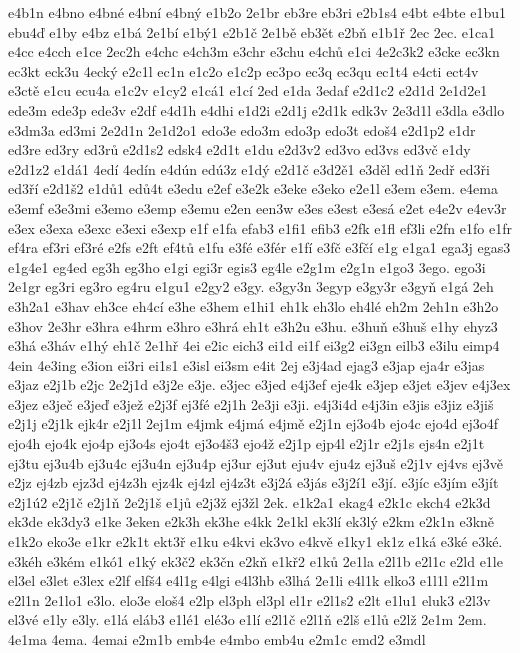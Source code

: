 {e4b1n
e4bno
e4bné
e4bní
e4bný
e1b2o
2e1br
eb3re
eb3ri
e2b1s4
e4bt
e4bte
e1bu1
ebu4ď
e1by
e4bz
e1bá
2e1bí
e1bý1
e2b1č
2e1bě
eb3ět
e2bň
e1b1ř
2ec
2ec.
e1ca1
e4cc
e4cch
e1ce
2ec2h
e4chc
e4ch3m
e3chr
e3chu
e4chů
e1ci
4e2c3k2
e3cke
ec3kn
ec3kt
eck3u
4ecký
e2c1l
ec1n
e1c2o
e1c2p
ec3po
ec3q
ec3qu
ec1t4
e4cti
ect4v
e3ctě
e1cu
ecu4a
e1c2v
e1cy2
e1cá1
e1cí
2ed
e1da
3edaf
e2d1c2
e2d1d
2e1d2e1
ede3m
ede3p
ede3v
e2df
e4d1h
e4dhi
e1d2i
e2d1j
e2d1k
edk3v
2e3d1l
e3dla
e3dlo
e3dm3a
ed3mi
2e2d1n
2e1d2o1
edo3e
edo3m
edo3p
edo3t
edoš4
e2d1p2
e1dr
ed3re
ed3ry
ed3rů
e2d1s2
edsk4
e2d1t
e1du
e2d3v2
ed3vo
ed3vs
ed3vč
e1dy
e2d1z2
e1dá1
4edí
4edín
e4dún
edú3z
e1dý
e2d1č
e3d2ě1
e3děl
ed1ň
2edř
ed3ři
ed3ří
e2d1š2
e1dů1
edů4t
e3edu
e2ef
e3e2k
e3eke
e3eko
e2e1l
e3em
e3em.
e4ema
e3emf
e3e3mi
e3emo
e3emp
e3emu
e2en
een3w
e3es
e3est
e3esá
e2et
e4e2v
e4ev3r
e3ex
e3exa
e3exc
e3exi
e3exp
e1f
e1fa
efab3
e1fi1
efib3
e2fk
e1fl
ef3li
e2fn
e1fo
e1fr
ef4ra
ef3ri
ef3ré
e2fs
e2ft
ef4tů
e1fu
e3fé
e3fér
e1fí
e3fč
e3fčí
e1g
e1ga1
ega3j
egas3
e1g4e1
eg4ed
eg3h
eg3ho
e1gi
egi3r
egis3
eg4le
e2g1m
e2g1n
e1go3
3ego.
ego3i
2e1gr
eg3ri
eg3ro
eg4ru
e1gu1
e2gy2
e3gy.
e3gy3n
3egyp
e3gy3r
e3gyň
e1gá
2eh
e3h2a1
e3hav
eh3ce
eh4cí
e3he
e3hem
e1hi1
eh1k
eh3lo
eh4lé
eh2m
2eh1n
e3h2o
e3hov
2e3hr
e3hra
e4hrm
e3hro
e3hrá
eh1t
e3h2u
e3hu.
e3huň
e3huš
e1hy
ehyz3
e3há
e3háv
e1hý
eh1č
2e1hř
4ei
e2ic
eich3
ei1d
ei1f
ei3g2
ei3gn
eilb3
e3ilu
eimp4
4ein
4e3ing
e3ion
ei3ri
ei1s1
e3isl
ei3sm
e4it
2ej
e3j4ad
ejag3
e3jap
eja4r
e3jas
e3jaz
e2j1b
e2jc
2e2j1d
e3j2e
e3je.
e3jec
e3jed
e4j3ef
eje4k
e3jep
e3jet
e3jev
e4j3ex
e3jez
e3ječ
e3jeď
e3jež
e2j3f
ej3fé
e2j1h
2e3ji
e3ji.
e4j3i4d
e4j3in
e3jis
e3jiz
e3jiš
e2j1j
e2j1k
ejk4r
e2j1l
2ej1m
e4jmk
e4jmá
e4jmě
e2j1n
ej3o4b
ejo4c
ejo4d
ej3o4f
ejo4h
ejo4k
ejo4p
ej3o4s
ejo4t
ej3o4š3
ejo4ž
e2j1p
ejp4l
e2j1r
e2j1s
ejs4n
e2j1t
ej3tu
ej3u4b
ej3u4c
ej3u4n
ej3u4p
ej3ur
ej3ut
eju4v
eju4z
ej3uš
e2j1v
ej4vs
ej3vě
e2jz
ej4zb
ejz3d
ej4z3h
ejz4k
ej4zl
ej4z3t
e3j2á
e3jás
e3j2í1
e3jí.
e3jíc
e3jím
e3jít
e2j1ú2
e2j1č
e2j1ň
2e2j1š
e1jů
e2j3ž
ej3žl
2ek.
e1k2a1
ekag4
e2k1c
ekch4
e2k3d
ek3de
ek3dy3
e1ke
3eken
e2k3h
ek3he
e4kk
2e1kl
ek3lí
ek3lý
e2km
e2k1n
e3kně
e1k2o
eko3e
e1kr
e2k1t
ekt3ř
e1ku
e4kvi
ek3vo
e4kvě
e1ky1
ek1z
e1ká
e3ké
e3ké.
e3kéh
e3kém
e1kó1
e1ký
ek3č2
ek3čn
e2kň
e1kř2
e1ků
2e1la
e2l1b
e2l1c
e2ld
e1le
el3el
e3let
e3lex
e2lf
elfš4
e4l1g
e4lgi
e4l3hb
e3lhá
2e1li
e4l1k
elko3
e1l1l
e2l1m
e2l1n
2e1lo1
e3lo.
elo3e
eloš4
e2lp
el3ph
el3pl
el1r
e2l1s2
e2lt
e1lu1
eluk3
e2l3v
el3vé
e1ly
e3ly.
e1lá
eláb3
e1lé1
elé3o
e1lí
e2l1č
e2l1ň
e2lš
e1lů
e2lž
2e1m
2em.
4e1ma
4ema.
4emai
e2m1b
emb4e
e4mbo
emb4u
e2m1c
emd2
e3mdl
}

